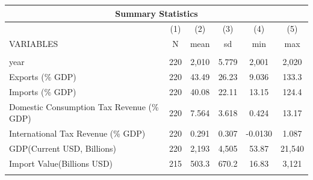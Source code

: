 \documentclass[]{article}
\begin{document}
\begin{tabular}{lccccc}
\multicolumn{6}{c}{Summary Statistics} \\ \hline
 & (1) & (2) & (3) & (4) & (5) \\
VARIABLES & N & mean & sd & min & max \\ \hline
 &  &  &  &  &  \\
year & 220 & 2,010 & 5.779 & 2,001 & 2,020 \\
Exports (\% GDP) & 220 & 43.49 & 26.23 & 9.036 & 133.3 \\
Imports (\% GDP) & 220 & 40.08 & 22.11 & 13.15 & 124.4 \\
Domestic Consumption Tax Revenue (\% GDP) & 220 & 7.564 & 3.618 & 0.424 & 13.17 \\
International Tax Revenue (\% GDP) & 220 & 0.291 & 0.307 & -0.0130 & 1.087 \\
GDP(Current USD, Billions) & 220 & 2,193 & 4,505 & 53.87 & 21,540 \\
Import Value(Billions USD) & 215 & 503.3 & 670.2 & 16.83 & 3,121 \\
 &  &  &  &  &  \\ \hline
\end{tabular}
\end{document}
